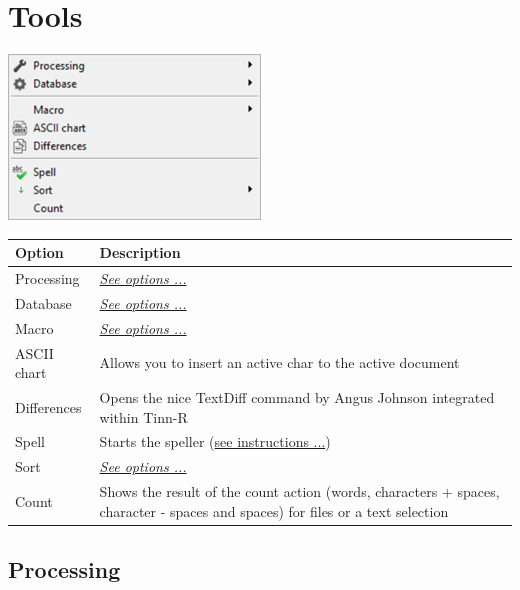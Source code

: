 
\hypertarget{menu_tools}{}
\section{Tools}

\includegraphics[scale=0.8]{./res/menu_tools.png}\\

\begin{scriptsize}
  \begin{tabularx}{\textwidth}{>{\hsize=0.2\hsize}X>{\hsize=0.8\hsize}X}\\
    \hline
    \textbf{Option} & \textbf{Description} \\
    \hline
    Processing & \textit{\href{\#menu\_tools\_processing}{See options ...}} \\
    Database & \textit{\href{\#menu\_tools\_database}{See options ...}} \\
    \hdashline[1pt/1pt]
    Macro & \textit{\href{\#menu\_tools\_macro}{See options ...}} \\
    ASCII chart & Allows you to insert an active char to the active document \\
    Differences & Opens the nice TextDiff command by Angus Johnson integrated within Tinn-R \\
    \hdashline[1pt/1pt]
    Spell & Starts the speller (\href{\#working\_tools\_spell}{see instructions ...}) \\
    Sort & \textit{\href{\#menu\_tools\_sort}{See options ...}} \\
    Count & Shows the result of the count action
     (words, characters + spaces, character - spaces and spaces) for files or a text selection \\
    \hline
  \end{tabularx}
\end{scriptsize}

\hypertarget{menu_tools_processing}{}
\subsection{Processing}

